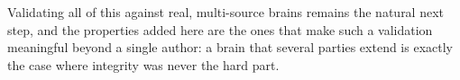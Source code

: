 \documentclass[11pt,a4paper]{article}
\begin{document}
Validating all of this against real, multi-source brains remains the natural
next step, and the properties added here are the ones that make such a
validation meaningful beyond a single author: a brain that several parties
extend is exactly the case where integrity was never the hard part.



\end{document}
